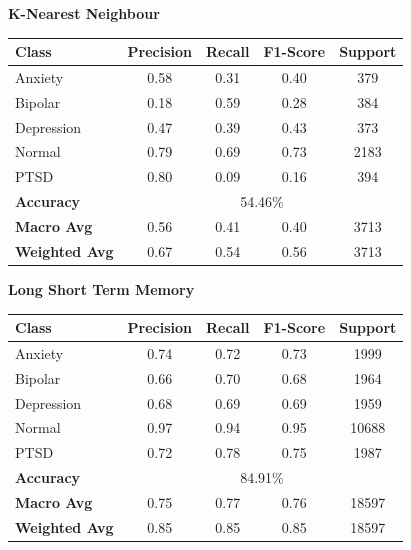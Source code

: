 \begin{center}
    \textbf{K-Nearest Neighbour} \\[0.2em]
    \begin{tabular}{|l|c|c|c|c|}
        \hline
        \textbf{Class} & \textbf{Precision} & \textbf{Recall} & \textbf{F1-Score} & \textbf{Support} \\ \hline
        Anxiety        & 0.58               & 0.31            & 0.40              & 379              \\ \hline
        Bipolar        & 0.18               & 0.59            & 0.28              & 384              \\ \hline
        Depression     & 0.47               & 0.39            & 0.43              & 373              \\ \hline
        Normal         & 0.79               & 0.69            & 0.73              & 2183             \\ \hline
        PTSD           & 0.80               & 0.09            & 0.16              & 394              \\ \hline
        \textbf{Accuracy} & \multicolumn{4}{|c|}{54.46\%} \\ \hline
        \textbf{Macro Avg} & 0.56            & 0.41            & 0.40              & 3713             \\ \hline
        \textbf{Weighted Avg} & 0.67         & 0.54            & 0.56              & 3713             \\ \hline
    \end{tabular}
\end{center}


\begin{center}
    \textbf{Long Short Term Memory} \\[0.2em]
    \begin{tabular}{|l|c|c|c|c|}
        \hline
        \textbf{Class} & \textbf{Precision} & \textbf{Recall} & \textbf{F1-Score} & \textbf{Support} \\ \hline
        Anxiety        & 0.74               & 0.72            & 0.73              & 1999             \\ \hline
        Bipolar        & 0.66               & 0.70            & 0.68              & 1964             \\ \hline
        Depression     & 0.68               & 0.69            & 0.69              & 1959             \\ \hline
        Normal         & 0.97               & 0.94            & 0.95              & 10688            \\ \hline
        PTSD           & 0.72               & 0.78            & 0.75              & 1987             \\ \hline
        \textbf{Accuracy} & \multicolumn{4}{|c|}{84.91\%} \\ \hline
        \textbf{Macro Avg} & 0.75            & 0.77            & 0.76              & 18597            \\ \hline
        \textbf{Weighted Avg} & 0.85         & 0.85            & 0.85              & 18597            \\ \hline
    \end{tabular}
\end{center}


